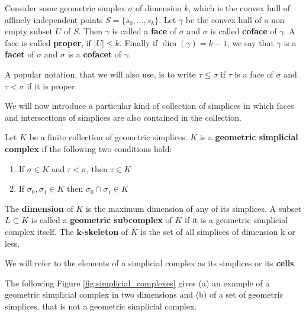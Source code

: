 \begin{defi} \cite[III.1]{Computational+Topology} 
    Consider some geometric simplex $\sigma$ of dimension $k$, which is the convex hull of affinely independent points $S = \{s_0, \dots , s_{k}\}$. Let $\gamma$ be the convex hull of a non-empty subset $U$ of $S$. Then $\gamma$ is called a \textbf{face} of $\sigma$ and $\sigma$ is called \textbf{coface} of $\gamma$.
A face is called \textbf{proper}, if $|U| \leq k$. Finally if $\operatorname{dim}(\gamma) = k-1$, we say that $\gamma$ is a \textbf{facet} of $\sigma$ and $\sigma$ is a \textbf{cofacet} of $\gamma$. 
\end{defi}

A popular notation, that we will also use, is to write $\tau \leq \sigma$ if $\tau$ is a face of $\sigma$ and $\tau < \sigma$ if it is proper.

We will now introduce a particular kind of collection of simplices in which faces and intersections of simplices are also contained in the collection.

\begin{defi}
    Let $K$ be a finite collection of geometric simplices. $K$ is a \textbf{geometric simplicial complex} if the following two conditions hold:
    \begin{enumerate}
        \item If $\sigma \in K \operatorname{and} \tau < \sigma$, then $\tau \in K$
        \item If $\sigma_0, \sigma_1 \in K$ then $\sigma_0 \cap \sigma_1 \in K$
    \end{enumerate}
The \textbf{dimension} of $K$ is the maximum dimension of any of its simplices.
    A subset $L \subset K$ is called a \textbf{geometric subcomplex} of $K$ if it is a geometric simplicial complex itself.
    The \textbf{$\bm{k}$-skeleton} of $K$ is the set of all simplices of dimension k or less.
\end{defi}

We will refer to the elements of a simplicial complex as its simplices or its \textbf{cells}.

The following Figure \ref{fig:simplicial_complexes} gives (a) an example of a geometric simplicial complex in two dimensions and (b) of a set of geometric simplices, that is not a geometric simplicial complex.

